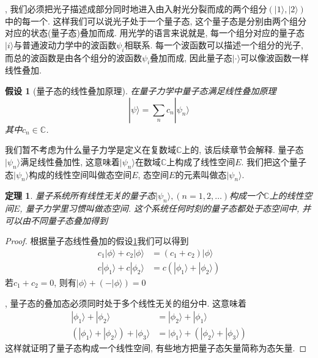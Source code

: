 \documentclass[a4paper,11pt]{article}
\newtheorem{theorem}{\hspace{2em}定理}[section]
\newtheorem{proof}{证明}[section]
\newtheorem{hypothesis}{假设}[section]
\begin{document}
, 我们必须把光子描述成部分同时地进入由入射光分裂而成的两个组分$(|1\rangle,|2\rangle)$中的每一个. 这样我们可以说光子处于一个量子态, 这个量子态是分别由两个组分对应的状态(量子态)叠加而成. 用光学的语言来说就是, 每一个组分对应的量子态$|i\rangle$与普通波动力学中的波函数$\psi_i$相联系. 每一个波函数可以描述一个组分的光子, 而总的波函数是由各个组分的波函数$\psi_i$叠加而成, 因此量子态$|\cdot\rangle$可以像波函数一样线性叠加.

\begin{hypothesis}[量子态的线性叠加原理]\label{Superposition hypothesis}
  在量子力学中量子态满足线性叠加原理
\begin{equation*}
  |\psi\rangle=\sum_{n}c_n|\psi_n\rangle
\end{equation*}
其中$c_n\in\mathbb{C}$.
\end{hypothesis}
我们暂不考虑为什么量子力学是定义在复数域$\mathbb{C}$上的, 该后续章节会解释. 量子态$|\psi_n\rangle$满足线性叠加性, 这意味着$|\psi_n\rangle$在数域$\mathbb{C}$上构成了线性空间$E$. 我们把这个量子态$|\psi_n\rangle$构成的线性空间叫做态空间$E$, 态空间$E$的元素叫做态$|\psi_n\rangle$.
\begin{theorem}
  量子系统所有线性无关的量子态$|\psi_n\rangle,(n=1,2,\dots)$构成一个$\mathbb{C}$上的线性空间$E$, 量子力学里习惯叫做态空间. 这个系统任何时刻的量子态都处于态空间中, 并可以由不同量子态叠加得到
\end{theorem}
\begin{proof}
  根据量子态线性叠加的假设\ref{Superposition hypothesis}我们可以得到
\begin{equation*}
  \begin{split}
     c_1|\phi\rangle+c_2|\phi\rangle&=(c_1+c_2)|\phi\rangle \\
     c|\phi_1\rangle+c|\phi_2\rangle&=c(|\phi_1\rangle+|\phi_2\rangle)
  \end{split}
\end{equation*}
若$c_1+c_2=0$, 则有$|\phi\rangle+(-|\phi\rangle)=0$

, 量子态的叠加态必须同时处于多个线性无关的组分中. 这意味着
\begin{equation*}
  \begin{split}
     |\phi_1\rangle+|\phi_2\rangle&=|\phi_2\rangle+|\phi_1\rangle\\
     (|\phi_1\rangle+|\phi_2\rangle)+|\phi_3\rangle&=|\phi_1\rangle+(|\phi_2\rangle+|\phi_3\rangle)
  \end{split}
\end{equation*}
这样就证明了量子态构成一个线性空间, 有些地方把量子态矢量简称为态矢量.
\end{proof}
\end{document}
